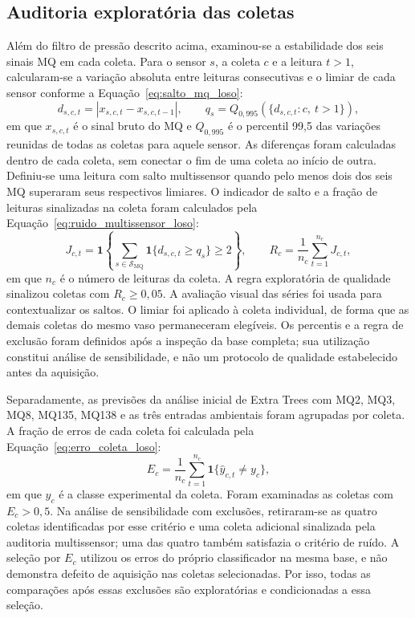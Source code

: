 
\subsection{Auditoria exploratória das coletas}
\label{subsec:auditoria_coletas_loso}

Além do filtro de pressão descrito acima, examinou-se a estabilidade dos
seis sinais MQ em cada coleta. Para o sensor $s$, a coleta $c$ e a leitura
$t>1$, calcularam-se a variação absoluta entre leituras consecutivas e o
limiar de cada sensor conforme a Equação~\eqref{eq:salto_mq_loso}:
\begin{equation}
    d_{s,c,t}=\left|x_{s,c,t}-x_{s,c,t-1}\right|,
    \qquad
    q_s=Q_{0{,}995}\!\left(\{d_{s,c,t}:c,\ t>1\}\right),
    \label{eq:salto_mq_loso}
\end{equation}
em que $x_{s,c,t}$ é o sinal bruto do MQ e $Q_{0{,}995}$ é o percentil
99,5 das variações reunidas de todas as coletas para aquele sensor.
As diferenças foram calculadas dentro de cada coleta, sem conectar o fim
de uma coleta ao início de outra. Definiu-se uma leitura com salto
multissensor quando pelo menos dois dos seis MQ superaram seus respectivos
limiares. O indicador de salto e a fração de leituras sinalizadas na coleta
foram calculados pela Equação~\eqref{eq:ruido_multissensor_loso}:
\begin{equation}
    J_{c,t}=\mathbf{1}\!\left\{
      \sum_{s\in\mathcal{S}_{\mathrm{MQ}}}
      \mathbf{1}\{d_{s,c,t}\geq q_s\}\geq 2
    \right\},
    \qquad
    R_c=\frac{1}{n_c}\sum_{t=1}^{n_c}J_{c,t},
    \label{eq:ruido_multissensor_loso}
\end{equation}
em que $n_c$ é o número de leituras da coleta. A regra exploratória de
qualidade sinalizou coletas com $R_c\geq 0{,}05$. A avaliação visual das
séries foi usada para contextualizar os saltos. O limiar foi aplicado à
coleta individual, de forma que as demais coletas do mesmo vaso permaneceram
elegíveis. Os percentis e a regra de exclusão foram definidos após a
inspeção da base completa; sua utilização constitui análise de
sensibilidade, e não um protocolo de qualidade estabelecido antes da
aquisição.

Separadamente, as previsões da análise inicial de Extra Trees com MQ2,
MQ3, MQ8, MQ135, MQ138 e as três entradas ambientais foram agrupadas por
coleta. A fração de erros de cada coleta foi calculada pela
Equação~\eqref{eq:erro_coleta_loso}:
\begin{equation}
    E_c=\frac{1}{n_c}\sum_{t=1}^{n_c}
    \mathbf{1}\{\widehat y_{c,t}\neq y_c\},
    \label{eq:erro_coleta_loso}
\end{equation}
em que $y_c$ é a classe experimental da coleta. Foram examinadas as
coletas com $E_c>0{,}5$. Na análise de sensibilidade com exclusões,
retiraram-se as quatro coletas identificadas por esse critério e uma
coleta adicional sinalizada pela auditoria multissensor; uma das quatro
também satisfazia o critério de ruído. A seleção por $E_c$ utilizou os
erros do próprio classificador na mesma base, e não demonstra defeito de
aquisição nas coletas selecionadas. Por isso, todas as comparações após
essas exclusões são exploratórias e condicionadas a essa seleção.

